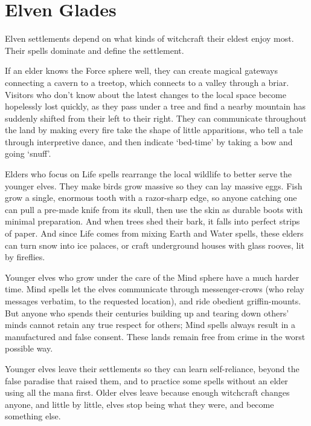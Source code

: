 \section[Elves]{Elven Glades \El}
\label{elvenGlades}


\begin{multicols}{2}
\renewcommand\npcsymbol{\El}

\noindent
Elven settlements depend on what kinds of \gls{witchcraft} their eldest enjoy most.
Their \glspl{spell} dominate and define the settlement.

If an elder knows the Force \gls{sphere} well, they can create magical gateways connecting a cavern to a treetop, which connects to a valley through a briar.
Visitors who don't know about the latest changes to the local space become hopelessly lost quickly, as they pass under a tree and find a nearby mountain has suddenly shifted from their left to their right.
They can communicate throughout the land by making every fire take the shape of little apparitions, who tell a tale through interpretive dance, and then indicate `bed-time' by taking a bow and going `snuff'.

Elders who focus on Life \glspl{spell} rearrange the local wildlife to better serve the younger elves.
They make birds grow massive so they can lay massive eggs.
Fish grow a single, enormous tooth with a razor-sharp edge, so anyone catching one can pull a pre-made knife from its skull, then use the skin as durable boots with minimal preparation.
And when trees shed their bark, it falls into perfect strips of paper.
And since Life comes from mixing Earth and Water \glspl{spell}, these elders can turn snow into ice palaces, or craft underground houses with glass rooves, lit by fireflies.

Younger elves who grow under the care of the Mind \gls{sphere} have a much harder time.
Mind \glspl{spell} let the elves communicate through messenger-crows (who relay messages verbatim, to the requested location), and ride obedient \gls{griffin}-mounts.
But anyone who spends their centuries building up and tearing down others' minds cannot retain any true respect for others; Mind \glspl{spell} always result in a manufactured and false consent.
These lands remain free from crime in the worst possible way.

Younger elves leave their settlements so they can learn self-reliance, beyond the false paradise that raised them, and to practice some \glspl{spell} without an elder using all the mana first.
Older elves leave because enough \gls{witchcraft} changes anyone, and little by little, elves stop being what they were, and become something else.


\end{multicols}
